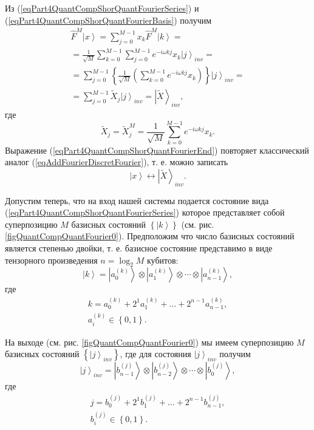 Из (\ref{eqPart4QuantCompShorQuantFourierSeries}) и
(\ref{eqPart4QuantCompShorQuantFourierBasis}) получим
\begin{eqnarray}
\hat{F}^{M}\left|x\right> = \sum_{j = 0}^{M - 1}x_k \hat{F}^{M}
\left|k\right> = 
\nonumber \\
= \frac{1}{\sqrt{M}}\sum_{k = 0}^{M -1}\sum_{j = 0}^{M - 1}
e^{-i \omega k j}x_k\left|j\right>_{inv} = 
\nonumber \\
= \sum_{j = 0}^{M - 1} \left\{\frac{1}{\sqrt{M}}\left(
\sum_{k = 0}^{M - 1}e^{-i \omega k j} x_k
\right)\right\}\left|j\right>_{inv} = 
\nonumber \\
= \sum_{j = 0}^{M - 1}\tilde{X}_j\left|j\right>_{inv} = \left|\tilde{X}\right>_{inv},
\nonumber
\end{eqnarray}
где 
\begin{equation}
\tilde{X}_j = \tilde{X}_j^{M} = 
\frac{1}{\sqrt{M}}\sum_{k = 0}^{M - 1}e^{-i \omega k j} x_k.
\label{eqPart4QuantCompShorQuantFourierEnd}
\end{equation}
Выражение (\ref{eqPart4QuantCompShorQuantFourierEnd}) повторяет
классический аналог (\ref{eqAddFourierDiscretFourier}), т. е. можно записать
\[
 \left|x\right> \longleftrightarrow \left|\tilde{X}\right>_{inv}.
\]



Допустим теперь, что на вход нашей системы подается состояние вида
(\ref{eqPart4QuantCompShorQuantFourierSeries}) которое представляет
собой суперпозицию $M$ базисных состояний
$\left\{\left|k\right>\right\}$ 
(см. рис. \ref{figQuantCompQuantFourier0}). 
Предположим что число базисных
состояний является степенью двойки, т. е. базисное состояние
представимо в виде тензорного произведения $n = \log_2{M}$ кубитов:
\begin{equation}
\left|k\right> = \left|a^{(k)}_0\right> \otimes  \left|a^{(k)}_1\right>
\otimes \cdots \otimes \left|a^{(k)}_{n-1}\right>, 
\nonumber
\end{equation}
где
\begin{eqnarray}
k = a^{(k)}_0 + 2^1 a^{(k)}_1 + \dots + 2^{n-1} a^{(k)}_{n-1},
\nonumber \\
a^{(k)}_i \in \left\{0, 1\right\}.
\nonumber
\end{eqnarray}

На выходе
(см. рис. \ref{figQuantCompQuantFourier0})
мы имеем суперпозицию $M$ базисных состояний
$\left\{\left|j\right>_{inv}\right\}$, где для состояния
$\left|j\right>_{inv}$ получим 
\begin{equation}
\left|j\right>_{inv} = \left|b^{(j)}_{n-1}\right> \otimes
\left|b^{(j)}_{n-2}\right> 
\otimes \cdots \otimes \left|b^{(j)}_{0}\right>, 
\nonumber
\end{equation}
где
\begin{eqnarray}
j = b^{(j)}_0 + 2^1 b^{(j)}_1 + \dots + 2^{n-1} b^{(j)}_{n-1},
\nonumber \\
b^{(j)}_i \in \left\{0, 1\right\}.
\nonumber
\end{eqnarray}

